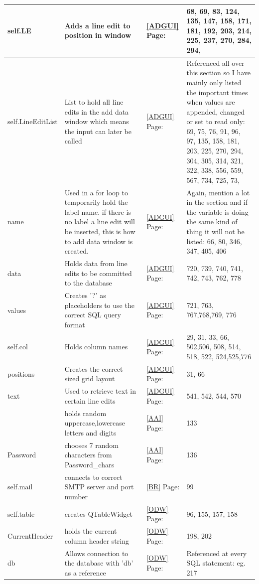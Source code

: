 \begin{center}
\begin{longtable}{|p{4cm}|p{3cm}|p{2cm}|p{3cm}|}
self.LE & Adds a line edit to position in window & \ref{ADGUI} Page: \pageref{ADGUI} &68, 69, 83, 124, 135, 147, 158, 171, 181, 192, 203, 214, 225, 237, 270, 284, 294,     \\ \hline
self.LineEditList & List to hold all line edits in the add data window which means the input can later be called & \ref{ADGUI} Page: \pageref{ADGUI} & Referenced all over this section so I have mainly only listed the important times when values are appended, changed or set to read only: 69, 75, 76, 91, 96, 97, 135, 158, 181, 203, 225, 270, 294, 304, 305, 314, 321, 322, 338, 556, 559, 567, 734, 725, 73,       \\ \hline
name & Used in a for loop to temporarily hold the label name. if there is no label a line edit will be inserted, this is how to add data window is created. & \ref{ADGUI} Page: \pageref{ADGUI} &  Again, mention a lot in the section and if the variable is doing the same kind of thing it will not be listed: 66, 80, 346, 347, 405, 406\\ \hline
data & Holds data from line edits to be committed to the database  & \ref{ADGUI} Page: \pageref{ADGUI} & 720, 739, 740, 741, 742, 743, 762, 778   \\ \hline
values & Creates '?' as placeholders to use the correct SQL query format  & \ref{ADGUI} Page: \pageref{ADGUI} & 721, 763, 767,768,769, 776  \\ \hline
self.col & Holds column names & \ref{ADGUI} Page: \pageref{ADGUI}&29, 31, 33, 66, 502,506, 508, 514, 518, 522, 524,525,776    \\ \hline
positions & Creates the correct sized grid layout & \ref{ADGUI} Page: \pageref{ADGUI} &31, 66   \\ \hline
text & Used to retrieve text in certain line edits  & \ref{ADGUI} Page: \pageref{ADGUI} & 541, 542, 544, 570 \\ \hline

\verb Password_chars & holds random uppercase,lowercase letters and digits & \ref{AAI} Page: \pageref{AAI} & 133 \\ \hline
Password & chooses 7 random characters from  Password\_chars & \ref{AAI} Page: \pageref{AAI} & 136 \\ \hline

self.mail & connects to correct SMTP server and port number& \ref{BR} Page: \pageref{BR} & 99  \\ \hline


self.table & creates QTableWidget& \ref{ODW}  Page: \pageref{ODW} & 96, 155, 157, 158 \\ \hline
CurrentHeader & holds the current column header string& \ref{ODW} Page: \pageref{ODW} & 198, 202 \\ \hline
db & Allows connection to the database with 'db' as a reference& \ref{ODW} Page: \pageref{ODW}& Referenced at every SQL statement: eg. 217\\ \hline


\end{longtable}
\end{center}
